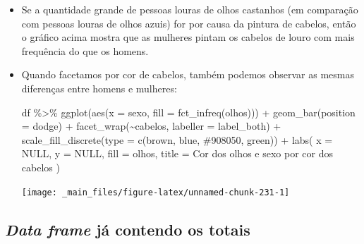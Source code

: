 \documentclass[
  11pt]{report}
\newenvironment{Shaded}{\begin{snugshade}}{\end{snugshade}}
\newcommand{\AttributeTok}[1]{\textcolor[rgb]{0.77,0.63,0.00}{#1}}
\newcommand{\ConstantTok}[1]{\textcolor[rgb]{0.00,0.00,0.00}{#1}}
\newcommand{\FunctionTok}[1]{\textcolor[rgb]{0.00,0.00,0.00}{#1}}
\newcommand{\NormalTok}[1]{#1}
\newcommand{\SpecialCharTok}[1]{\textcolor[rgb]{0.00,0.00,0.00}{#1}}
\newcommand{\StringTok}[1]{\textcolor[rgb]{0.31,0.60,0.02}{#1}}
\renewenvironment{Shaded}{
    \begin{mdframed}[%
      roundcorner=2pt,%
      innerleftmargin=5pt,%
      innerrightmargin=5pt,%
      topline=true,%
      leftline=true,%
      rightline=true,%
      bottomline=true,%
      linewidth=0.5pt,%
      linecolor=black!20,%
      backgroundcolor=black!2,%
      skipabove=2ex,%
      skipbelow=2.5ex%
    ]%
  }
  {
    \end{mdframed}
  }
\begin{document}
\begin{itemize}
\item
  Se a quantidade grande de pessoas louras de olhos castanhos (em comparação com pessoas louras de olhos azuis) for por causa da pintura de cabelos, então o gráfico acima mostra que as mulheres pintam os cabelos de louro com mais frequência do que os homens.
\item
  Quando facetamos por cor de cabelos, também podemos observar as mesmas diferenças entre homens e mulheres:

\begin{Shaded}
\begin{Highlighting}[]
\NormalTok{df }\SpecialCharTok{\%\textgreater{}\%} 
  \FunctionTok{ggplot}\NormalTok{(}\FunctionTok{aes}\NormalTok{(}\AttributeTok{x =}\NormalTok{ sexo, }\AttributeTok{fill =} \FunctionTok{fct\_infreq}\NormalTok{(olhos))) }\SpecialCharTok{+}
    \FunctionTok{geom\_bar}\NormalTok{(}\AttributeTok{position =} \StringTok{\textquotesingle{}dodge\textquotesingle{}}\NormalTok{) }\SpecialCharTok{+}
    \FunctionTok{facet\_wrap}\NormalTok{(}\SpecialCharTok{\textasciitilde{}}\NormalTok{cabelos, }\AttributeTok{labeller =}\NormalTok{ label\_both) }\SpecialCharTok{+}
    \FunctionTok{scale\_fill\_discrete}\NormalTok{(}\AttributeTok{type =} \FunctionTok{c}\NormalTok{(}\StringTok{\textquotesingle{}brown\textquotesingle{}}\NormalTok{, }\StringTok{\textquotesingle{}blue\textquotesingle{}}\NormalTok{, }\StringTok{\textquotesingle{}\#908050\textquotesingle{}}\NormalTok{, }\StringTok{\textquotesingle{}green\textquotesingle{}}\NormalTok{)) }\SpecialCharTok{+}
    \FunctionTok{labs}\NormalTok{(}
      \AttributeTok{x =} \ConstantTok{NULL}\NormalTok{,}
      \AttributeTok{y =} \ConstantTok{NULL}\NormalTok{,}
      \AttributeTok{fill =} \StringTok{\textquotesingle{}olhos\textquotesingle{}}\NormalTok{,}
      \AttributeTok{title =} \StringTok{\textquotesingle{}Cor dos olhos e sexo por cor dos cabelos\textquotesingle{}}
\NormalTok{    )}
\end{Highlighting}
\end{Shaded}

  \begin{center}\texttt{[image: \_main\_files/figure-latex/unnamed-chunk-231-1]} \end{center}
\end{itemize}

\hypertarget{data-frame-juxe1-contendo-os-totais}{%
\subsection{\texorpdfstring{\emph{Data frame} já contendo os totais}{Data frame já contendo os totais}}\label{data-frame-juxe1-contendo-os-totais}}
\end{document}
